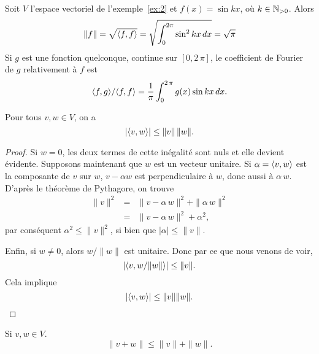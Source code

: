 \begin{example}
  \label{exe:5}
  Soit $V$ l'espace vectoriel de l'exemple~\ref{ex:2} et $f(x) = \sin kx$, où $k \in \mathbb{N}_{>0}$. Alors
  \begin{displaymath}
   \|f\| = \sqrt{\langle {f,f} \rangle} =  \sqrt{\int_0^{2\pi} \sin^2 kx \, dx} = \sqrt{\pi}
  \end{displaymath}
Si $g$ est une fonction quelconque, continue sur $[0,2\,\pi]$, le coefficient de Fourier de $g$ relativement à $f$ est 
\begin{displaymath}
  \langle {f,g} \rangle /   \langle {f,f} \rangle  = \frac{1}{\pi} \int_0^{2\, \pi} g(x) \sin kx \,dx. 
\end{displaymath}
\end{example}



\begin{theorem}
  Pour tous $v,w \in V$, on a  
  \begin{displaymath}
    |\langle {v,w} \rangle| \leq \|v\| \, \|w\|.
  \end{displaymath}
\end{theorem}


\begin{proof}
  Si $w=0$, les deux termes de cette inégalité sont nuls et elle devient évidente. Supposons maintenant que $w$ est un vecteur unitaire. Si $\alpha = \langle {v,w} \rangle$ est la composante de $v$ sur $w$, $v - \alpha w$ est perpendiculaire à $w$, donc aussi à $\alpha\,w$. D'après le théorème de Pythagore, on trouve 
  \begin{eqnarray*}
    \|v\|^2 & = & \|v - \alpha \,w\|^2 + \|\alpha \, w \|^2 \\
           & = &  \|v - \alpha \,w\|^2 + \alpha^2,
  \end{eqnarray*}
par conséquent $\alpha^2 \leq \|v\|^2$, si bien que $|\alpha| \leq \|v\|$. 

Enfin, si $w \neq 0$, alors $w / \|w\|$ est unitaire. Donc par ce que nous venons de voir,
\begin{displaymath}
  \left| \langle {v, w / \|w\|} \rangle \right| \leq \|v\|.
\end{displaymath}
Cela implique 
\begin{displaymath}
   \left| \langle {v, w } \rangle \right| \leq \|v\| \|w\|.
\end{displaymath}
\end{proof}




\begin{theorem}
  \label{thr:1}
  Si $v,w \in V$. 
  \begin{displaymath}
    \|v+w\| \leq \|v\| + \|w\|. 
  \end{displaymath}
\end{theorem}


